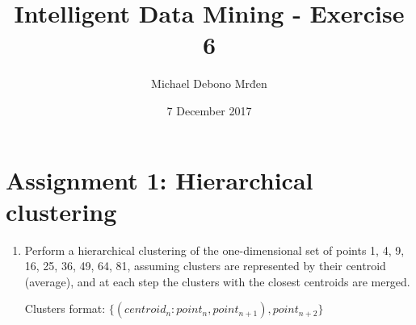 \documentclass{article}
\title{Intelligent Data Mining - Exercise 6}
\author{\fontencoding{T1}\selectfont Michael Debono Mrđen}
\date{7 December 2017}
\begin{document}
\maketitle

\section{Assignment 1: Hierarchical clustering}
\renewcommand{\labelenumi}{\alph{enumi}.}
\renewcommand{\labelenumii}{\arabic{enumii}.}

\begin{enumerate}
\item{Perform a hierarchical clustering of the one-dimensional set of points 1, 4, 9, 16, 25, 36, 49, 64, 81, assuming clusters are represented by their centroid (average), and at each step the clusters with the closest centroids are merged.

Clusters format: $\{(centroid_n:point_n,point_{n+1}),point_{n+2}\}$

}
\end{enumerate}
\end{document}
